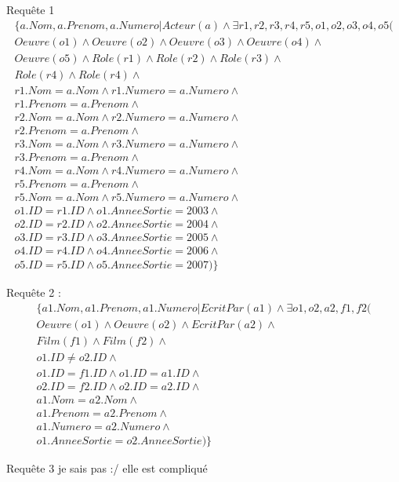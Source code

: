 \documentclass[10pt,a4paper]{article}
\begin{document}
\begin{list}{*}{}
\item Requête 1
\noindent
\[\begin{aligned}
      \{ a.Nom, a.Prenom, a.Numero | Acteur(a) \wedge \exists r1, r2, r3, r4, r5, o1, o2, o3, o4, o5 ( \\
       Oeuvre(o1) \wedge Oeuvre(o2) \wedge Oeuvre(o3) \wedge Oeuvre(o4) \wedge \\
       Oeuvre(o5) \wedge Role(r1) \wedge Role(r2) \wedge Role(r3) \wedge \\
       Role(r4) \wedge Role(r4)\wedge \\
       r1.Nom = a.Nom \wedge r1.Numero = a.Numero \wedge \\
       r1.Prenom = a.Prenom \wedge \\
       r2.Nom = a.Nom \wedge r2.Numero = a.Numero \wedge \\
       r2.Prenom = a.Prenom \wedge \\
       r3.Nom = a.Nom \wedge r3.Numero = a.Numero \wedge \\
       r3.Prenom = a.Prenom \wedge \\
       r4.Nom = a.Nom \wedge r4.Numero = a.Numero \wedge \\
       r5.Prenom = a.Prenom \wedge \\
       r5.Nom = a.Nom \wedge r5.Numero = a.Numero \wedge \\
       o1.ID = r1.ID \wedge o1.AnneeSortie = 2003 \wedge \\
       o2.ID = r2.ID \wedge o2.AnneeSortie = 2004 \wedge \\
       o3.ID = r3.ID \wedge o3.AnneeSortie = 2005 \wedge \\
       o4.ID = r4.ID \wedge o4.AnneeSortie = 2006 \wedge \\
       o5.ID = r5.ID \wedge o5.AnneeSortie = 2007) \}
\end{aligned}\]
\item Requête 2 :
\noindent
\[\begin{aligned}
\{ a1.Nom, a1.Prenom, a1.Numero | EcritPar(a1) \wedge \exists o1, o2, a2, f1, f2 ( \\
      Oeuvre(o1) \wedge Oeuvre(o2) \wedge EcritPar(a2) \wedge \\
       Film(f1) \wedge Film(f2) \wedge \\
       o1.ID \neq o2.ID \wedge \\
       o1.ID = f1.ID \wedge o1.ID = a1.ID \wedge \\
       o2.ID = f2.ID \wedge o2.ID = a2.ID \wedge \\
       a1.Nom = a2.Nom \wedge \\
       a1.Prenom = a2.Prenom \wedge \\
       a1.Numero = a2.Numero \wedge \\
       o1.AnneeSortie = o2.AnneeSortie) \}
\end{aligned}\]
\item Requête 3 je sais pas :/ elle est compliqué


\end{list}
\end{document}
